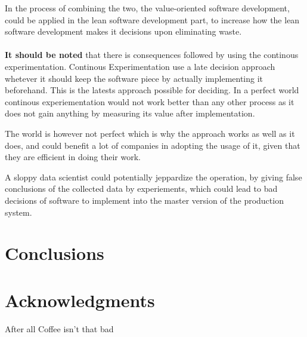 \documentclass{sig-alternate}
\begin{document}
In the process of combining the two, the value-oriented software development, could be applied in the lean
software development part, to increase how the lean software development makes it decisions upon eliminating 
waste.
\\
\\
\textbf{It should be noted} that there is consequences followed by using the continous experimentation. 
Continous Experimentation use a late decision approach whetever it should keep the software piece by 
actually implementing it beforehand. 
This is the latests approach possible for deciding. In a perfect world continous experiementation would not
work better than any other process as it does not gain anything by measuring its value after implementation.

The world is however not perfect which is why the approach works as well as it does, and could benefit 
a lot of companies in adopting the usage of it, given that they are efficient in doing their work. 

A sloppy data scientist could potentially jeppardize the operation, by giving false conclusions of the 
collected data by experiements, which could lead to bad decisions of software to implement into the master
version of the production system.

\section{Conclusions}

\section{Acknowledgments}

After all Coffee isn't that bad 

%

%
%
\end{document}
